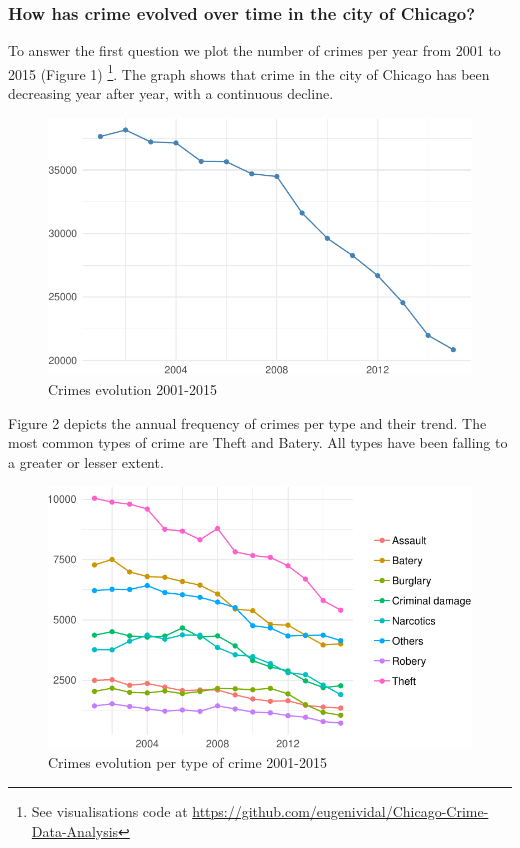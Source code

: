 \documentclass[]{article}
\let\rmarkdownfootnote\footnote%
\def\footnote{\protect\rmarkdownfootnote}
\begin{document}
\subsubsection{How has crime evolved over time in the city of
Chicago?}\label{how-has-crime-evolved-over-time-in-the-city-of-chicago}

To answer the first question we plot the number of crimes per year from
2001 to 2015 (Figure 1) \footnote{See visualisations code at
  \url{https://github.com/eugenividal/Chicago-Crime-Data-Analysis}}. The
graph shows that crime in the city of Chicago has been decreasing year
after year, with a continuous decline.

\begin{figure}[H]

{\centering \includegraphics{201081646_MATH5741M_files/figure-latex/fig-1} 

}

\caption{Crimes evolution 2001-2015}\label{fig:fig}
\end{figure}

Figure 2 depicts the annual frequency of crimes per type and their
trend. The most common types of crime are Theft and Batery. All types
have been falling to a greater or lesser extent.

\begin{figure}[H]

{\centering \includegraphics{201081646_MATH5741M_files/figure-latex/fig2-1} 

}

\caption{Crimes evolution per type of crime 2001-2015}\label{fig:fig2}
\end{figure}
\end{document}
